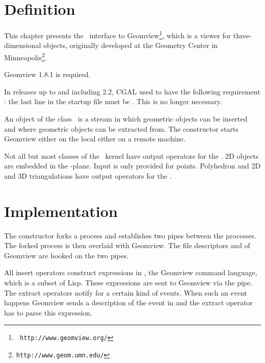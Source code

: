 



\newcommand{\note}[1]{{\bf NOTE: #1}}


\section{Definition}

This chapter presents the \cgal\ interface to Geomview\footnote{\tt
http://www.geomview.org/}, which is a
viewer for three-dimensional objects, originally developed at the Geometry
Center in Minneapolis\footnote{\tt http://www.geom.umn.edu/}.

Geomview 1.8.1 is required.

 In releases up to and including 2.2, CGAL used to have
the following requirement : the last line in the startup file 
must be .  This is no longer necessary.


An object of the class \ is a stream in which geometric
objects can be inserted and where geometric objects can be extracted
from. The constructor starts Geomview either on the local either on
a remote machine.



Not all but most classes of the \cgal\ kernel have output
operators for the  . 
2D objects are embedded in the -plane.
Input is only provided for points.
Polyhedron and 2D and 3D triangulations  have output
operators for the  . 


\section{Implementation}

The constructor forks a process and establishes two pipes between the
processes. The forked process is then overlaid with Geomview. The
file descriptors  and  of Geomview are hooked
on the two pipes.

All insert operators construct expressions in , the Geomview
command language, which is a subset of {\sc Lisp}. These expressions
are sent to Geomview via the pipe. The extract operators notify 
for a certain kind of events. When such an event happens Geomview
sends a description of the event in  and the extract operator has
to parse this expression.


